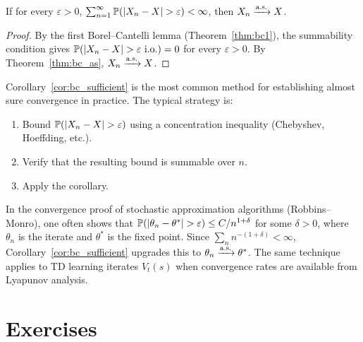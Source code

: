 \documentclass[11pt,a4paper]{article}
\begin{document}
\begin{corollary}
\label{cor:bc_sufficient}
If for every $\varepsilon > 0$,
$\sum_{n=1}^\infty \mathbb{P}(|X_n - X| > \varepsilon) < \infty$,
then $X_n \xrightarrow{\text{a.s.}} X$.
\end{corollary}

\begin{proof}
By the first Borel--Cantelli lemma (Theorem~\ref{thm:bc1}), the
summability condition gives
$\mathbb{P}(|X_n - X| > \varepsilon \text{ i.o.}) = 0$ for every
$\varepsilon > 0$.  By Theorem~\ref{thm:bc_as},
$X_n \xrightarrow{\text{a.s.}} X$.
\end{proof}

\begin{remark}
\label{rem:bc_sufficient_usage}
Corollary~\ref{cor:bc_sufficient} is the most common method for
establishing almost sure convergence in practice.  The typical
strategy is:
\begin{enumerate}[nosep]
  \item Bound $\mathbb{P}(|X_n - X| > \varepsilon)$ using a
    concentration inequality (Chebyshev, Hoeffding, etc.).
  \item Verify that the resulting bound is summable over $n$.
  \item Apply the corollary.
\end{enumerate}
\end{remark}

\begin{rlconnection}[title={Borel--Cantelli in Stochastic Approximation}]
In the convergence proof of stochastic approximation algorithms
(Robbins--Monro), one often shows that
$\mathbb{P}(|\theta_n - \theta^*| > \varepsilon) \leq C/n^{1+\delta}$
for some $\delta > 0$, where $\theta_n$ is the iterate and
$\theta^*$ is the fixed point.  Since
$\sum_n n^{-(1+\delta)} < \infty$,
Corollary~\ref{cor:bc_sufficient} upgrades this to
$\theta_n \xrightarrow{\text{a.s.}} \theta^*$.  The same technique applies to
TD learning iterates $V_t(s)$ when convergence rates are
available from Lyapunov analysis.
\end{rlconnection}


\section{Exercises}
\label{sec:exercises}
\end{document}
